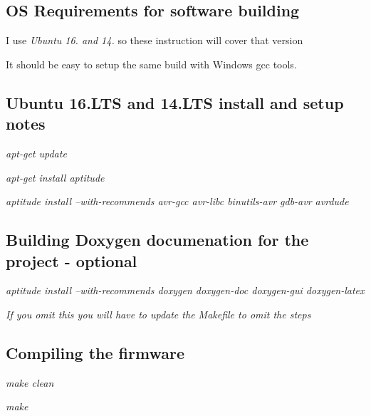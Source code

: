 \subsection*{OS Requirements for software building}


\begin{DoxyItemize}
\item I use {\itshape Ubuntu 16. and 14.} so these instruction will cover that version
\item It should be easy to setup the same build with Windows gcc tools.
\end{DoxyItemize}

\subsection*{Ubuntu 16.\+L\+TS and 14.\+L\+TS install and setup notes}


\begin{DoxyItemize}
\item {\itshape apt-\/get update}
\item {\itshape apt-\/get install aptitude}
\item {\itshape aptitude install --with-\/recommends avr-\/gcc avr-\/libc binutils-\/avr gdb-\/avr avrdude}
\end{DoxyItemize}

\subsection*{Building Doxygen documenation for the project -\/ optional}


\begin{DoxyItemize}
\item {\itshape aptitude install --with-\/recommends doxygen doxygen-\/doc doxygen-\/gui doxygen-\/latex}
\item {\itshape If you omit this you will have to update the Makefile to omit the steps}
\end{DoxyItemize}

\subsection*{Compiling the firmware}


\begin{DoxyItemize}
\item {\itshape make clean}
\item {\itshape make}
\end{DoxyItemize}

